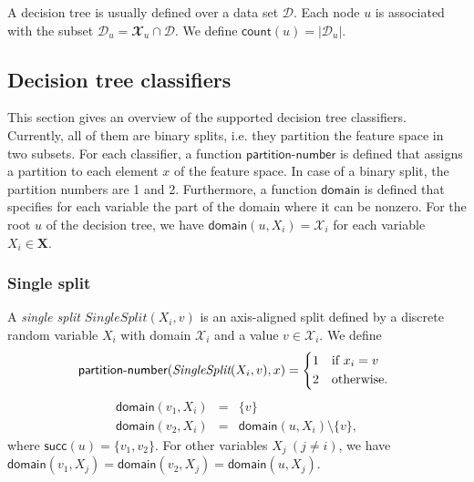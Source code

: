 \documentclass{article}
\newcommand{\func}[1]{\ensuremath{\textsf{#1}}} %
\newcommand{\obj}[1]{\ensuremath{\textit{#1}}} %
\newcommand{\set}[1]{\ensuremath{\{ #1 \} }} %
\begin{document}
\vspace{0.5cm}
\noindent
A decision tree is usually defined over a data set $\mathcal{D}$. Each node $u$ is associated with the subset $\mathcal{D}_u = \mathbfcal{X}_u \cap \mathcal{D}$. We define $\func{count}(u) = |\mathcal{D}_u|$.

\subsection{Decision tree classifiers}
This section gives an overview of the supported decision tree classifiers. Currently, all of them are binary splits, i.e. they partition the feature space in two subsets. For each classifier, a function \func{partition-number} is defined that assigns a partition to each element $x$ of the feature space. In case of a binary split, the partition numbers are 1 and 2.
Furthermore, a function \func{domain} is defined that specifies for each variable the part of the domain where it can be nonzero. For the root $u$ of the decision tree, we have $\func{domain}(u, X_i) = \mathcal{X}_i$ for each variable $X_i \in \mathbf{X}$.

\subsubsection*{Single split}
A \emph{single split} $\obj{SingleSplit}(X_i, v)$ is an axis-aligned split defined by a discrete random variable $X_i$ with domain $\mathcal{X}_i$ and a value $v \in \mathcal{X}_i$. We define
\[
\func{partition-number}(\obj{SingleSplit}(X_i, v), x) =
\begin{cases*}
1 & if $x_i = v$ \\
2 & otherwise.
\end{cases*}
\]
\[
\begin{array}{lll}
\func{domain}(v_1, X_i) &=& \set{v} \\ 
\func{domain}(v_2, X_i) &=& \func{domain}(u, X_i) \setminus \set{v},
\end{array}
\]
where $\func{succ}(u) = \set{v_1, v_2}$. For other variables $X_j ~ (j \neq i)$, we have $\func{domain}(v_1, X_j) = \func{domain}(v_2, X_j) = \func{domain}(u, X_j)$.
\end{document}
